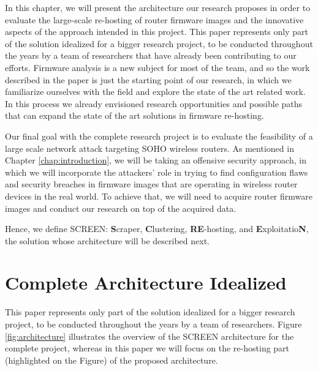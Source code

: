 
In this chapter, we will present the architecture our research proposes in order to evaluate the large-scale re-hosting of router firmware images and the innovative aspects of the approach intended in this project. This paper represents only part of the solution idealized for a bigger research project, to be conducted throughout the years by a team of researchers that have already been contributing to our efforts. Firmware analysis is a new subject for most of the team, and so the work described in the paper is just the starting point of our research, in which we familiarize ourselves with the field and explore the state of the art related work. In this process we already envisioned research opportunities and possible paths that can expand the state of the art solutions in firmware re-hosting.

Our final goal with the complete research project is to evaluate the feasibility of a large scale network attack targeting SOHO wireless routers. As mentioned in Chapter \ref{chap:introduction}, we will be taking an offensive security approach, in which we will incorporate the attackers' role in trying to find configuration flaws and security breaches in firmware images that are operating in wireless router devices in the real world. To achieve that, we will need to acquire router firmware images and conduct our research on top of the acquired data. 

Hence, we define SCREEN: {\bf S}craper, {\bf C}lustering, {\bf RE}-hosting, and {\bf E}xploitatio{\bf N}, the solution whose architecture will be described next.

\section{Complete Architecture Idealized}

This paper represents only part of the solution idealized for a bigger research project, to be conducted throughout the years by a team of researchers. Figure \ref{fig:architecture} illustrates the overview of the SCREEN architecture for the complete project, whereas in this paper we will focus on the re-hosting part (highlighted on the Figure) of the proposed architecture. 

